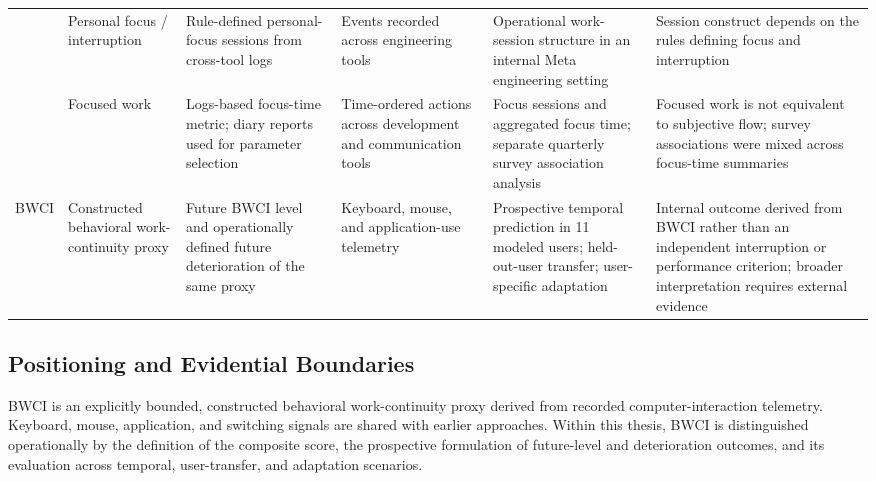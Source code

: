 \begin{table}[htbp]
\begin{tabularx}{\textwidth}{
@{}
>{\raggedright\arraybackslash}p{}
>{\raggedright\arraybackslash}p{}
Y
Y
>{\raggedright\arraybackslash}p{0.17\textwidth}
Y
@{}
}
\addlinespace

\textcite{chen2022workgraph} &
Personal focus / interruption &
Rule-defined personal-focus sessions from cross-tool logs &
Events recorded across engineering tools &
Operational work-session structure in an internal Meta engineering
setting &
Session construct depends on the rules defining focus and interruption \\

\addlinespace

\textcite{brown2023focusedWork} &
Focused work &
Logs-based focus-time metric; diary reports used for parameter selection &
Time-ordered actions across development and communication tools &
Focus sessions and aggregated focus time; separate quarterly survey
association analysis &
Focused work is not equivalent to subjective flow; survey associations
were mixed across focus-time summaries \\

\addlinespace

BWCI &
Constructed behavioral work-continuity proxy &
Future BWCI level and operationally defined future deterioration of the
same proxy &
Keyboard, mouse, and application-use telemetry &
Prospective temporal prediction in 11 modeled users; held-out-user
transfer; user-specific adaptation &
Internal outcome derived from BWCI rather than an independent interruption
or performance criterion; broader interpretation requires external evidence \\

\bottomrule


\end{tabularx}

\endgroup
\end{table}
\clearpage


\subsection{Positioning and Evidential Boundaries}

BWCI is an explicitly bounded, constructed behavioral work-continuity proxy derived from recorded computer-interaction telemetry. Keyboard, mouse, application, and switching signals are shared with earlier approaches. Within this thesis, BWCI is distinguished operationally by the definition of the composite score, the prospective formulation of future-level and deterioration outcomes, and its evaluation across temporal, user-transfer, and adaptation scenarios.

